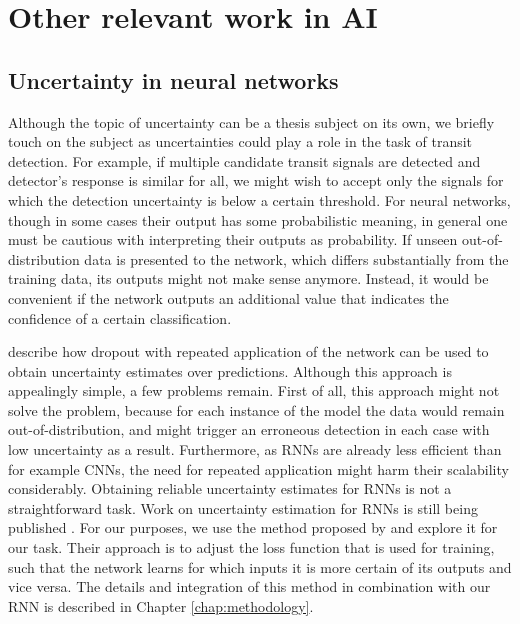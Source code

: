 
\section{Other relevant work in AI}

\subsection{Uncertainty in neural networks}
Although the topic of uncertainty can be a thesis subject on its own, we briefly touch on the subject as uncertainties could play a role in the task of transit detection. For example, if multiple candidate transit signals are detected and detector's response is similar for all, we might wish to accept only the signals for which the detection uncertainty is below a certain threshold. For neural networks, though in some cases their output has some probabilistic meaning, in general one must be cautious with interpreting their outputs as probability. If unseen out-of-distribution data is presented to the network, which differs substantially from the training data, its outputs might not make sense anymore.  Instead, it would be convenient if the network outputs an additional value that indicates the confidence of a certain classification. 

\cite{gal2016dropout} describe how dropout with repeated application of the network can be used to obtain uncertainty estimates over predictions. Although this approach is appealingly simple, a few problems remain. First of all, this approach might not solve the problem, because for each instance of the model the data would remain out-of-distribution, and might trigger an erroneous detection in each case with low uncertainty as a result. Furthermore, as RNNs are already less efficient than for example CNNs, the need for repeated application might harm their scalability considerably. Obtaining reliable uncertainty estimates for RNNs is not a straightforward task. Work on uncertainty estimation for RNNs is still being published \citep{alaa2020frequentist, hwang2020sampling, wang2020uncertainty}. For our purposes, we use the method proposed by \cite{devries2018learning} and explore it for our task. Their approach is to adjust the loss function that is used for training, such that the network learns for which inputs it is more certain of its outputs and vice versa. The details and integration of this method in combination with our RNN is described in Chapter \ref{chap:methodology}.



